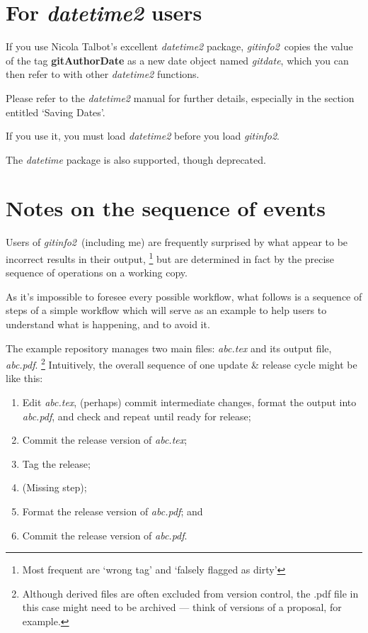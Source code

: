 \documentclass[a4paper,12pt,twoside,openany]{memoir}
\newcommand{\sfit}[1]{\textit{#1}}
\newcommand{\tpname}{\sfit{gitinfo2}}
\begin{document}
\section{For \sfit{datetime2} users}
\label{sect:dtuser}
If you use Nicola Talbot's excellent \sfit{datetime2} package,
\tpname\ copies the value of the tag {\ttfamily\bfseries gitAuthorDate}
as a new date object named \sfit{gitdate},
which you can then refer to with other \sfit{datetime2}
functions.

Please refer to the \sfit{datetime2} manual for
further details,
especially in the section entitled `Saving Dates'.

If you use it, you must load \sfit{datetime2}
before you load \tpname.

The \sfit{datetime} package is also supported, 
though deprecated. 

\section{Notes on the sequence of events}
\label{sect:seqeve}
Users of \tpname\ (including me) are frequently surprised
by what appear to be incorrect results in their output,%
\footnote{Most frequent are `wrong tag' and `falsely flagged as dirty'}
but are determined in fact by the precise sequence of operations
on a working copy.

As it's impossible to foresee every possible workflow,
what follows is a sequence of steps of a simple workflow
which will serve as an example to help users
to understand what is happening, and to avoid it.

The example repository manages two main files:
\sfit{abc.tex} and its output file, \sfit{abc.pdf}.%
\footnote{Although derived files are often excluded from version control,
the .pdf file in this case might need to be archived ---
think of versions of a proposal, for example.}
Intuitively, the overall sequence of one update \& release cycle
might be like this:

\begin{enumerate}
\item Edit \sfit{abc.tex}, (perhaps) commit intermediate changes,
format the output into \sfit{abc.pdf}, and
check and repeat until ready for release;
\item \label{wf:tex} Commit the release version of \sfit{abc.tex};
\item \label{wf:tag} Tag the release;
\item \label{wf:git} (Missing step);
\item \label{wf:pdf} Format the release version of \sfit{abc.pdf}; and
\item Commit the release version of \sfit{abc.pdf}.
\end{enumerate}
\end{document}
